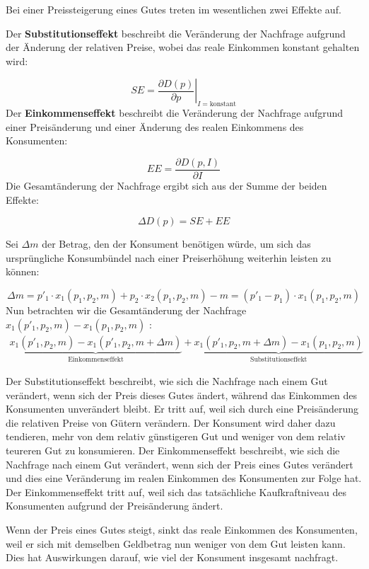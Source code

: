Bei einer Preissteigerung eines Gutes treten im wesentlichen zwei Effekte auf.
\begin{definition}

	Der \textbf{Substitutionseffekt} beschreibt die Veränderung der Nachfrage aufgrund der Änderung der relativen Preise, wobei das reale Einkommen konstant gehalten wird:

	\[
		SE = \left. \frac{\partial D(p)}{\partial p} \right|_{I = \text{konstant}}
	\]
	Der \textbf{Einkommenseffekt} beschreibt die Veränderung der Nachfrage aufgrund einer Preisänderung und einer Änderung des realen Einkommens des Konsumenten:

	\[
		EE = \frac{\partial D(p, I)}{\partial I}
	\]
	Die Gesamtänderung der Nachfrage ergibt sich aus der Summe der beiden Effekte:

	\[
		\Delta D(p) = SE + EE
	\]
\end{definition}
Sei \( \Delta m \) der Betrag, den der Konsument benötigen würde, um sich das ursprüngliche Konsumbündel nach einer Preiserhöhung weiterhin leisten zu können:

\[
	\Delta m = p'_1 \cdot x_1(p_1, p_2, m) + p_2 \cdot x_2(p_1, p_2, m) - m = (p'_1 - p_1) \cdot x_1(p_1, p_2, m)
\]
Nun betrachten wir die Gesamtänderung der Nachfrage $x_1(p'_1, p_2, m) - x_1(p_1, p_2, m)$ :
\begin{align*}
	\underbrace{x_1(p'_1, p_2, m) - x_1(p'_1, p_2, m + \Delta m)}_{\text{Einkommenseffekt}} + \underbrace{x_1(p'_1, p_2, m + \Delta m) - x_1(p_1, p_2, m)}_{\text{Substitutionseffekt}}
\end{align*}

Der Substitutionseffekt beschreibt, wie sich die Nachfrage nach einem Gut verändert, wenn sich der Preis dieses Gutes ändert, während das Einkommen des Konsumenten unverändert bleibt. Er tritt auf, weil sich durch eine Preisänderung die relativen Preise von Gütern verändern. Der Konsument wird daher dazu tendieren, mehr von dem relativ günstigeren Gut und weniger von dem relativ teureren Gut zu konsumieren.
Der Einkommenseffekt beschreibt, wie sich die Nachfrage nach einem Gut verändert, wenn sich der Preis eines Gutes verändert und dies eine Veränderung im realen Einkommen des Konsumenten zur Folge hat. Der Einkommenseffekt tritt auf, weil sich das tatsächliche Kaufkraftniveau des Konsumenten aufgrund der Preisänderung ändert.

Wenn der Preis eines Gutes steigt, sinkt das reale Einkommen des Konsumenten, weil er sich mit demselben Geldbetrag nun weniger von dem Gut leisten kann. Dies hat Auswirkungen darauf, wie viel der Konsument insgesamt nachfragt.

